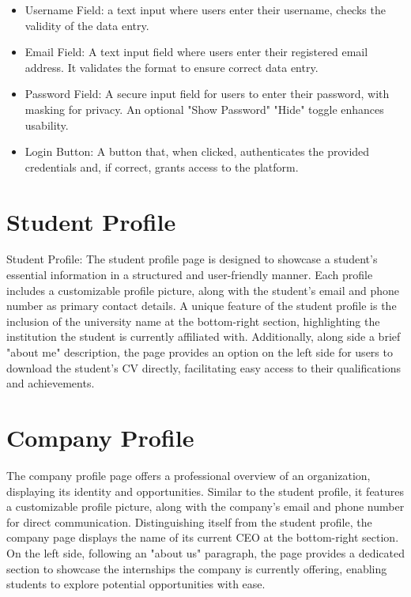 \begin{itemize}
    \item Username Field: a text input where users enter their username, checks the validity of the data entry.
    \item Email Field: A text input field where users enter their registered email address. 
    It validates the format to ensure correct data entry.
    \item Password Field: A secure input field for users to enter their password, with masking for privacy. 
    An optional "Show Password" "Hide" toggle enhances usability.
    \item Login Button: A button that, when clicked, authenticates the provided credentials 
    and, if correct, grants access to the platform. 
\end{itemize}

\section{Student Profile}
Student Profile:
The student profile page is designed to showcase a student's essential information 
in a structured and user-friendly manner. 
Each profile includes a customizable profile picture, along with the student’s email and phone number 
as primary contact details. A unique feature of the student profile is the inclusion of the university name 
at the bottom-right section, highlighting the institution the student is currently affiliated with. 
Additionally, along side a brief "about me" description, the page provides an option on the left side 
for users to download the student's CV directly, 
facilitating easy access to their qualifications and achievements.

\section{Company Profile}
The company profile page offers a professional overview of an organization, 
displaying its identity and opportunities. 
Similar to the student profile, it features a customizable profile picture, along with the company’s 
email and phone number for direct communication. 
Distinguishing itself from the student profile, the company page displays the name of
 its current CEO at the bottom-right section. On the left side, following an "about us" paragraph, the page provides a
  dedicated section to showcase the internships the company is currently offering, enabling students to explore potential
   opportunities with ease.

